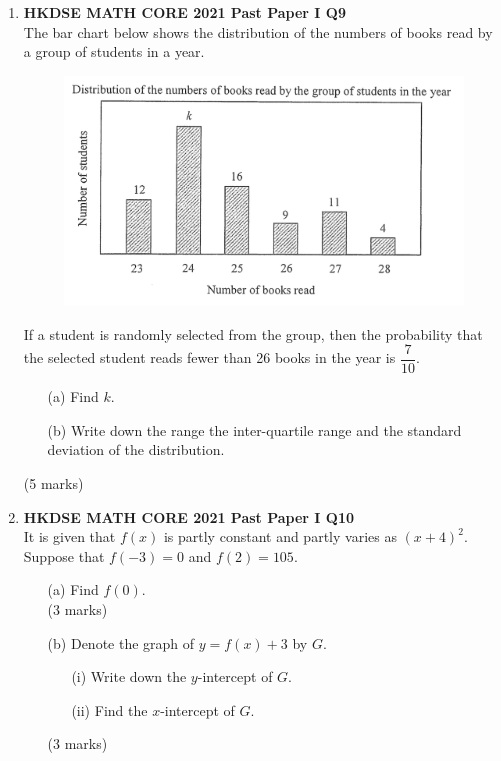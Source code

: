 \documentclass[12pt]{article}
\begin{document}
\begin{enumerate}
	\item \textbf{HKDSE MATH CORE 2021 Past Paper I Q9}\\
	The bar chart below shows the distribution of the numbers of books read by a group of students in a year.
	\begin{figure}[H]
		\centering
		\includegraphics[width = .3\linewidth]{2021Figure1.00}
	\end{figure}
	If a student is randomly selected from the group, then the probability that the selected student reads fewer than 26 books in the year is $\dfrac{7}{10}$.
	\begin{enumerate}
		\item[(a)] Find $k$.
		\item[(b)] Write down the range the inter-quartile range and the standard deviation of the distribution.
	\end{enumerate}
	(5 marks)

	\item \textbf{HKDSE MATH CORE 2021 Past Paper I Q10}\\
	It is given that $f(x)$ is partly constant and partly varies as $(x + 4)^2$. Suppose that $f(-3) = 0$ and $f(2) = 105$.
	\begin{enumerate}
		\item[(a)] Find $f(0)$. \\(3 marks)
		\item[(b)] Denote the graph of $y = f(x) + 3$ by $G$. 
		\begin{enumerate}
			\item[(i)] Write down the $y$-intercept of $G$.
			\item[(ii)] Find the $x$-intercept of $G$.
		\end{enumerate}
		(3 marks)
	\end{enumerate}


\end{enumerate}
\end{document}
